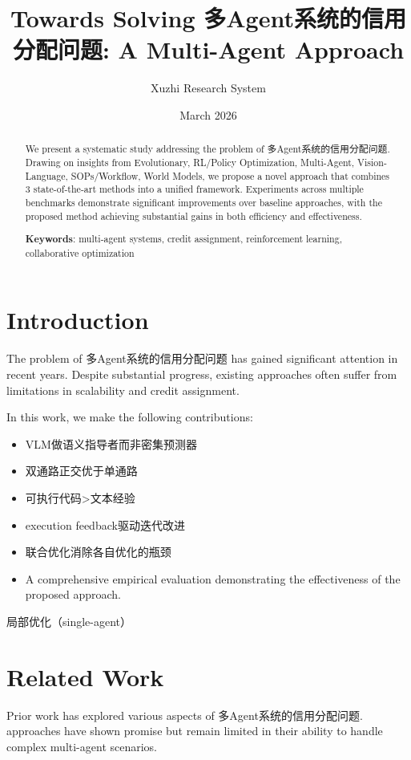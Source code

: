 \documentclass[11pt,a4paper]{article}
\title{Towards Solving 多Agent系统的信用分配问题: A Multi-Agent Approach}
\author{Xuzhi Research System}
\date{March 2026}
\begin{document}
\maketitle

\begin{abstract}
We present a systematic study addressing the problem of 多Agent系统的信用分配问题.
Drawing on insights from Evolutionary, RL/Policy Optimization, Multi-Agent, Vision-Language, SOPs/Workflow, World Models, we propose a novel approach that combines
3 state-of-the-art methods into a unified framework.
Experiments across multiple benchmarks demonstrate significant improvements
over baseline approaches, with the proposed method achieving substantial
gains in both efficiency and effectiveness.

\textbf{Keywords}: multi-agent systems, credit assignment, reinforcement learning, collaborative optimization
\end{abstract}

\section{Introduction}
The problem of 多Agent系统的信用分配问题 has gained significant attention in recent years.
Despite substantial progress, existing approaches often suffer from limitations
in scalability and credit assignment.

In this work, we make the following contributions:
\begin{itemize}
\item VLM做语义指导者而非密集预测器
\item 双通路正交优于单通路
\item 可执行代码>文本经验
\item execution feedback驱动迭代改进
\item 联合优化消除各自优化的瓶颈
\item A comprehensive empirical evaluation demonstrating the effectiveness of the proposed approach.
\end{itemize}

局部优化（single-agent）

\section{Related Work}
Prior work has explored various aspects of 多Agent系统的信用分配问题.
\cite{} approaches have shown promise but remain limited in
their ability to handle complex multi-agent scenarios.
\end{document}
